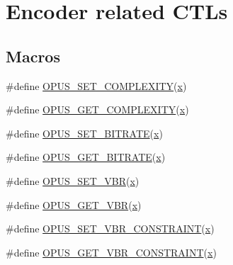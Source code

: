\hypertarget{group__opus__encoderctls}{}\section{Encoder related C\+T\+Ls}
\label{group__opus__encoderctls}
\subsection*{Macros}
\begin{DoxyCompactItemize}
\item 
\#define \mbox{\hyperlink{group__opus__encoderctls_ga3483877bf1687a75dd4a1de6f85f291c}{O\+P\+U\+S\+\_\+\+S\+E\+T\+\_\+\+C\+O\+M\+P\+L\+E\+X\+I\+TY}}(\mbox{\hyperlink{_s_d_l__opengl_8h_ad0e63d0edcdbd3d79554076bf309fd47}{x}})
\item 
\#define \mbox{\hyperlink{group__opus__encoderctls_ga89755ee721a38d964c7630a920eb27d2}{O\+P\+U\+S\+\_\+\+G\+E\+T\+\_\+\+C\+O\+M\+P\+L\+E\+X\+I\+TY}}(\mbox{\hyperlink{_s_d_l__opengl_8h_ad0e63d0edcdbd3d79554076bf309fd47}{x}})
\item 
\#define \mbox{\hyperlink{group__opus__encoderctls_ga0bb51947e355b33d0cb358463b5101a7}{O\+P\+U\+S\+\_\+\+S\+E\+T\+\_\+\+B\+I\+T\+R\+A\+TE}}(\mbox{\hyperlink{_s_d_l__opengl_8h_ad0e63d0edcdbd3d79554076bf309fd47}{x}})
\item 
\#define \mbox{\hyperlink{group__opus__encoderctls_ga1427a5560cbc7e9a59f986d89c05082c}{O\+P\+U\+S\+\_\+\+G\+E\+T\+\_\+\+B\+I\+T\+R\+A\+TE}}(\mbox{\hyperlink{_s_d_l__opengl_8h_ad0e63d0edcdbd3d79554076bf309fd47}{x}})
\item 
\#define \mbox{\hyperlink{group__opus__encoderctls_ga34d09ae06cab7e1a6c49876249b67892}{O\+P\+U\+S\+\_\+\+S\+E\+T\+\_\+\+V\+BR}}(\mbox{\hyperlink{_s_d_l__opengl_8h_ad0e63d0edcdbd3d79554076bf309fd47}{x}})
\item 
\#define \mbox{\hyperlink{group__opus__encoderctls_ga58feba30c167962305ec268e6abe8c08}{O\+P\+U\+S\+\_\+\+G\+E\+T\+\_\+\+V\+BR}}(\mbox{\hyperlink{_s_d_l__opengl_8h_ad0e63d0edcdbd3d79554076bf309fd47}{x}})
\item 
\#define \mbox{\hyperlink{group__opus__encoderctls_gab1b534a4fe55373f1be407ad4b2b22bd}{O\+P\+U\+S\+\_\+\+S\+E\+T\+\_\+\+V\+B\+R\+\_\+\+C\+O\+N\+S\+T\+R\+A\+I\+NT}}(\mbox{\hyperlink{_s_d_l__opengl_8h_ad0e63d0edcdbd3d79554076bf309fd47}{x}})
\item 
\#define \mbox{\hyperlink{group__opus__encoderctls_gab35fa5691ba0dd932031b7839c47513c}{O\+P\+U\+S\+\_\+\+G\+E\+T\+\_\+\+V\+B\+R\+\_\+\+C\+O\+N\+S\+T\+R\+A\+I\+NT}}(\mbox{\hyperlink{_s_d_l__opengl_8h_ad0e63d0edcdbd3d79554076bf309fd47}{x}})

\end{DoxyCompactItemize}
